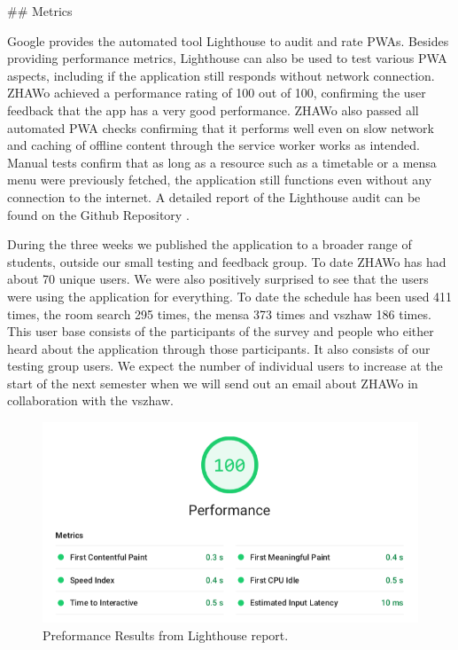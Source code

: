 \begin{markdown}
## Metrics

Google provides the automated tool Lighthouse \cite{Lighthouse} to audit and rate PWAs. Besides providing performance metrics, Lighthouse can also be used to test various PWA aspects, including if the application still responds without network connection. ZHAWo achieved a performance rating of 100 out of 100, confirming the user feedback that the app has a very good performance. ZHAWo also passed all automated PWA checks confirming that it performs well even on slow network and caching of offline content through the service worker works as intended. Manual tests confirm that as long as a resource such as a timetable or a mensa menu were previously fetched, the application still functions even without any connection to the internet. A detailed report of the Lighthouse audit can be found on the Github Repository \cite{OurGithub}.

During the three weeks we published the application to a broader range of students, outside our small testing and feedback group. To date ZHAWo has had about 70 unique users. We were also positively surprised to see that the users were using the application for everything. To date the schedule has been used 411 times, the room search 295 times, the mensa 373 times and vszhaw 186 times. This user base consists of the participants of the survey and people who either heard about the application through those participants. It also consists of our testing group users. We expect the number of individual users to increase at the start of the next semester when we will send out an email about ZHAWo in collaboration with the vszhaw.

\begin{figure}[H]
  \includegraphics[width=13cm, center]{../../metrics/ZHAWoLighthousereportBAPreformance.png}
  \captionsetup{width=15.5cm}
  \caption [Lighthouse Preformance]{Preformance Results from Lighthouse report.}
  \label{fig:LighthousePreformance}
\end{figure}

\newpage

\end{markdown}

